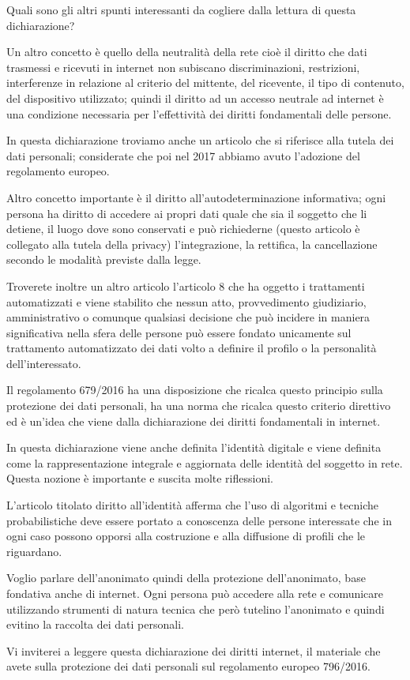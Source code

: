 Quali sono gli altri spunti interessanti da cogliere dalla lettura di questa dichiarazione?

Un altro concetto è quello della neutralità della rete cioè il diritto che dati trasmessi e ricevuti in internet non subiscano discriminazioni, restrizioni, interferenze in relazione al criterio del mittente, del ricevente, il tipo di contenuto, del dispositivo utilizzato; quindi il diritto ad un accesso neutrale ad internet è una condizione necessaria per l'effettività dei diritti fondamentali delle persone.

In questa dichiarazione troviamo anche un articolo che si riferisce alla tutela dei dati personali; considerate che poi nel 2017 abbiamo avuto l'adozione del regolamento europeo.

Altro concetto importante è il diritto all'autodeterminazione informativa; ogni persona ha diritto di accedere ai propri dati quale che sia il soggetto che li detiene, il luogo dove sono conservati e può richiederne (questo articolo è collegato  alla tutela della privacy) l'integrazione, la rettifica, la cancellazione secondo le modalità previste dalla legge.

Troverete inoltre un altro articolo l'articolo 8 che ha oggetto i trattamenti automatizzati e viene stabilito che nessun atto, provvedimento giudiziario, amministrativo o comunque qualsiasi decisione che può incidere in maniera significativa nella sfera delle persone può essere fondato unicamente sul trattamento automatizzato dei dati volto a definire il profilo o la personalità dell'interessato.

Il regolamento 679/2016 ha una disposizione che ricalca questo principio sulla protezione dei dati personali, ha una norma che ricalca questo criterio direttivo ed è un'idea che viene dalla dichiarazione dei diritti fondamentali in internet.

In questa dichiarazione viene anche definita l'identità digitale e viene definita come la rappresentazione integrale e aggiornata delle identità del soggetto in rete. Questa nozione è importante e suscita molte riflessioni. 

L'articolo titolato diritto all'identità afferma che l'uso di algoritmi e tecniche probabilistiche deve essere portato a conoscenza delle persone interessate che in ogni caso possono opporsi alla costruzione e alla diffusione di profili che le riguardano.

Voglio parlare dell'anonimato quindi della protezione dell'anonimato, base fondativa anche di internet. 
Ogni persona può accedere alla rete e comunicare utilizzando strumenti di natura tecnica che però tutelino l'anonimato e quindi evitino la raccolta dei dati personali.

Vi inviterei a leggere questa dichiarazione dei diritti internet, il materiale che avete sulla protezione dei dati personali sul regolamento europeo 796/2016.
